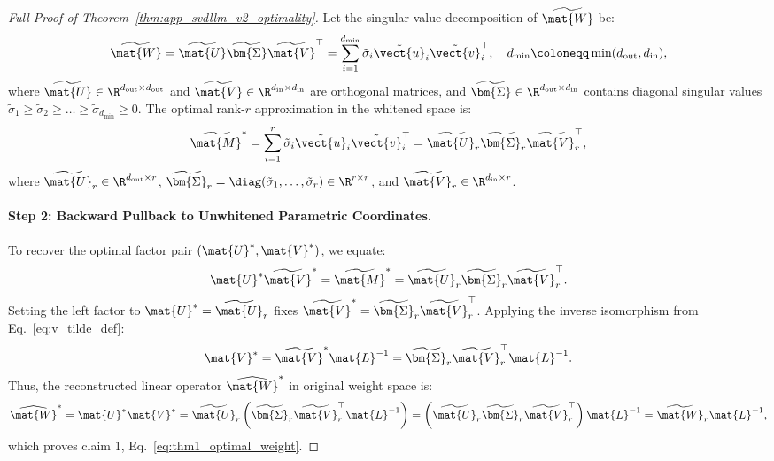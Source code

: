 \begin{proof}[Full Proof of Theorem~\ref{thm:app_svdllm_v2_optimality}]
Let the singular value decomposition of $\widetilde{\mat{W}}$ be:
\begin{equation}
\widetilde{\mat{W}} = \widetilde{\mat{U}} \widetilde{\bm{\Sigma}} \widetilde{\mat{V}}^\top = \sum_{i=1}^{d_{\min}} \tilde{\sigma}_i \tilde{\vect{u}}_i \tilde{\vect{v}}_i^\top, \quad d_{\min} \coloneqq \min(d_{\text{out}}, d_{\text{in}}),
\end{equation}
where $\widetilde{\mat{U}} \in \R^{d_{\text{out}} \times d_{\text{out}}}$ and $\widetilde{\mat{V}} \in \R^{d_{\text{in}} \times d_{\text{in}}}$ are orthogonal matrices, and $\widetilde{\bm{\Sigma}} \in \R^{d_{\text{out}} \times d_{\text{in}}}$ contains diagonal singular values $\tilde{\sigma}_1 \ge \tilde{\sigma}_2 \ge \dots \ge \tilde{\sigma}_{d_{\min}} \ge 0$.
The optimal rank-$r$ approximation in the whitened space is:
\begin{equation}
\widetilde{\mat{M}}^* = \sum_{i=1}^r \tilde{\sigma}_i \tilde{\vect{u}}_i \tilde{\vect{v}}_i^\top = \widetilde{\mat{U}}_r \widetilde{\bm{\Sigma}}_r \widetilde{\mat{V}}_r^\top,
\label{eq:optimal_m_tilde}
\end{equation}
where $\widetilde{\mat{U}}_r \in \R^{d_{\text{out}} \times r}$, $\widetilde{\bm{\Sigma}}_r = \diag(\tilde{\sigma}_1, \dots, \tilde{\sigma}_r) \in \R^{r \times r}$, and $\widetilde{\mat{V}}_r \in \R^{d_{\text{in}} \times r}$.

\paragraph{Step 2: Backward Pullback to Unwhitened Parametric Coordinates.}
To recover the optimal factor pair $(\mat{U}^*, \mat{V}^*)$, we equate:
\begin{equation}
\mat{U}^* \widetilde{\mat{V}}^* = \widetilde{\mat{M}}^* = \widetilde{\mat{U}}_r \widetilde{\bm{\Sigma}}_r \widetilde{\mat{V}}_r^\top.
\end{equation}
Setting the left factor to $\mat{U}^* = \widetilde{\mat{U}}_r$ fixes $\widetilde{\mat{V}}^* = \widetilde{\bm{\Sigma}}_r \widetilde{\mat{V}}_r^\top$.
Applying the inverse isomorphism from Eq.~\eqref{eq:v_tilde_def}:
\begin{equation}
\mat{V}^* = \widetilde{\mat{V}}^* \mat{L}^{-1} = \widetilde{\bm{\Sigma}}_r \widetilde{\mat{V}}_r^\top \mat{L}^{-1}.
\end{equation}
Thus, the reconstructed linear operator $\widehat{\mat{W}}^*$ in original weight space is:
\begin{equation}
\widehat{\mat{W}}^* = \mat{U}^* \mat{V}^* = \widetilde{\mat{U}}_r \left(\widetilde{\bm{\Sigma}}_r \widetilde{\mat{V}}_r^\top \mat{L}^{-1}\right) = \left(\widetilde{\mat{U}}_r \widetilde{\bm{\Sigma}}_r \widetilde{\mat{V}}_r^\top\right) \mat{L}^{-1} = \widetilde{\mat{W}}_r \mat{L}^{-1},
\end{equation}
which proves claim 1, Eq.~\eqref{eq:thm1_optimal_weight}.


\end{proof}
